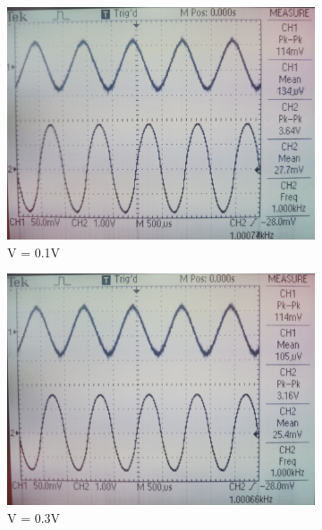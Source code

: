 \documentclass[12pt]{article}
\begin{document}
\begin{figure}[H]
	\centering
	\begin{subfigure}[b]{0.45\linewidth}
		\centering
		\includegraphics[width = \linewidth, trim = {0 0 0 0}, clip]{PartD_1.jpg}
		\caption{V = 0.1V}
	\end{subfigure}
	\begin{subfigure}[b]{0.45\linewidth}
		\centering
		\includegraphics[width = \linewidth, trim = {0 0 0 0}, clip]{PartD_2.jpg}
		\caption{V = 0.3V}
	\end{subfigure}
	\begin{subfigure}[b]{0.45\linewidth}
		\centering

\end{subfigure}
\end{figure}
\end{document}
